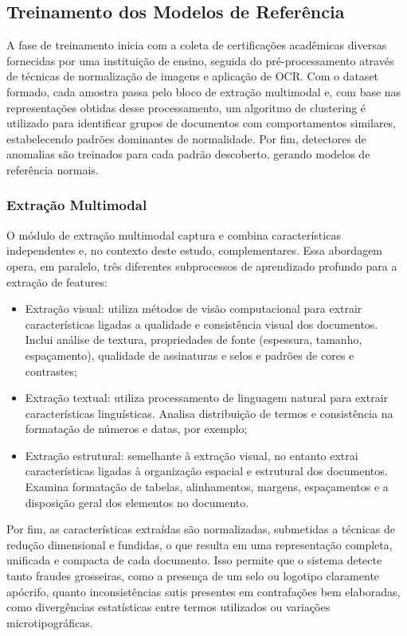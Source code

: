 \documentclass[12pt]{article}
\begin{document}
\subsection{Treinamento dos Modelos de Referência}

A fase de treinamento inicia com a coleta de certificações acadêmicas diversas fornecidas por uma instituição de ensino, seguida do pré-processamento através de técnicas de normalização de imagens e aplicação de OCR. Com o dataset formado, cada amostra passa pelo bloco de extração multimodal e, com base nas representações obtidas desse processamento, um algoritmo de clustering é utilizado para identificar grupos de documentos com comportamentos similares, estabelecendo padrões dominantes de normalidade. Por fim, detectores de anomalias são treinados para cada padrão descoberto, gerando modelos de referência normais.

\subsubsection{Extração Multimodal}

O módulo de extração multimodal captura e combina características independentes e, no contexto deste estudo, complementares. Essa abordagem opera, em paralelo, três diferentes subprocessos de aprendizado profundo para a extração de features:

\begin{itemize}
  \item Extração visual: utiliza métodos de visão computacional para extrair características ligadas a qualidade e consistência visual dos documentos. Inclui análise de textura, propriedades de fonte (espessura, tamanho, espaçamento), qualidade de assinaturas e selos e padrões de cores e contrastes;
  \item Extração textual: utiliza processamento de linguagem natural para extrair características linguísticas. Analisa distribuição de termos e consistência na formatação de números e datas, por exemplo;
  \item Extração estrutural: semelhante à extração visual, no entanto extrai características ligadas à organização espacial e estrutural dos documentos. Examina formatação de tabelas, alinhamentos, margens, espaçamentos e a disposição geral dos elementos no documento.
\end{itemize}

Por fim, as características extraídas são normalizadas, submetidas a técnicas de redução dimensional e fundidas, o que resulta em uma representação completa, unificada e compacta de cada documento. Isso permite que o sistema detecte tanto fraudes grosseiras, como a presença de um selo ou logotipo claramente apócrifo, quanto inconsistências sutis presentes em contrafações bem elaboradas, como divergências estatísticas entre termos utilizados ou variações microtipográficas.
\end{document}
